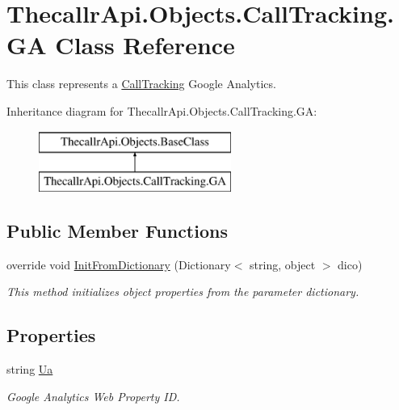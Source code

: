 \hypertarget{class_thecallr_api_1_1_objects_1_1_call_tracking_1_1_g_a}{\section{Thecallr\+Api.\+Objects.\+Call\+Tracking.\+G\+A Class Reference}
\label{class_thecallr_api_1_1_objects_1_1_call_tracking_1_1_g_a}
}


This class represents a \hyperlink{class_thecallr_api_1_1_objects_1_1_call_tracking_1_1_call_tracking}{Call\+Tracking} Google Analytics.  


Inheritance diagram for Thecallr\+Api.\+Objects.\+Call\+Tracking.\+G\+A\+:\begin{figure}[H]
\begin{center}
\leavevmode
\includegraphics[height=2.000000cm]{class_thecallr_api_1_1_objects_1_1_call_tracking_1_1_g_a}
\end{center}
\end{figure}
\subsection*{Public Member Functions}
\begin{DoxyCompactItemize}
\item 
override void \hyperlink{class_thecallr_api_1_1_objects_1_1_call_tracking_1_1_g_a_a67873a01d68fd703fa349882846b7826}{Init\+From\+Dictionary} (Dictionary$<$ string, object $>$ dico)
\begin{DoxyCompactList}\small\item\em This method initializes object properties from the parameter dictionary. \end{DoxyCompactList}\end{DoxyCompactItemize}
\subsection*{Properties}
\begin{DoxyCompactItemize}
\item 
string \hyperlink{class_thecallr_api_1_1_objects_1_1_call_tracking_1_1_g_a_a139a813922b509a8d633c8ff47f89578}{Ua}
\begin{DoxyCompactList}\small\item\em Google Analytics Web Property I\+D. \end{DoxyCompactList}\end{DoxyCompactItemize}


